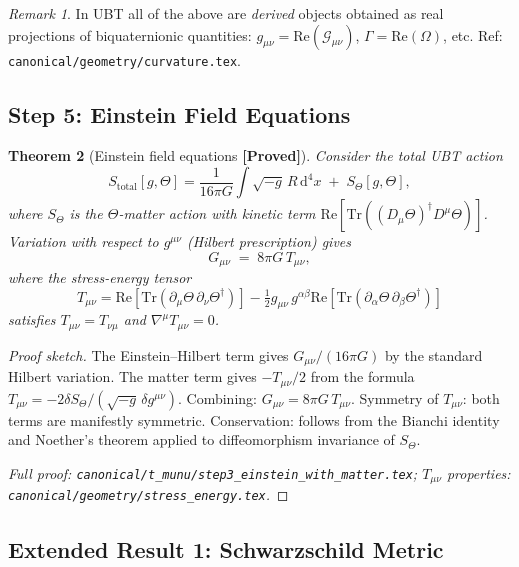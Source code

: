 \documentclass[12pt,a4paper]{article}
\newtheorem{theorem}{Theorem}[section]
\theoremstyle{definition}
\theoremstyle{remark}
\newtheorem{remark}[theorem]{Remark}
\newcommand{\PROVED}{\textbf{[Proved]}}
\begin{document}
\begin{remark}
In UBT all of the above are \emph{derived} objects obtained as real
projections of biquaternionic quantities:
$g_{\mu\nu}=\mathrm{Re}(\mathcal{G}_{\mu\nu})$,
$\Gamma=\mathrm{Re}(\Omega)$, etc.
Ref: \texttt{canonical/geometry/curvature.tex}.
\end{remark}

\subsection{Step 5: Einstein Field Equations}
\label{sec:step5}

\begin{theorem}[Einstein field equations \PROVED]
\label{thm:einstein}
Consider the total UBT action
\[
  S_{\mathrm{total}}[g,\Theta]
  = \frac{1}{16\pi G}\int\!\!\sqrt{-g}\,R\,\mathrm{d}^4x
  \;+\; S_\Theta[g,\Theta],
\]
where $S_\Theta$ is the $\Theta$-matter action with kinetic term
$\mathrm{Re}[\mathrm{Tr}((D_\mu\Theta)^\dagger D^\mu\Theta)]$.
Variation with respect to $g^{\mu\nu}$ (Hilbert prescription) gives
\[
  G_{\mu\nu} \;=\; 8\pi G\,T_{\mu\nu},
\]
where the stress-energy tensor
\[
  T_{\mu\nu}
  = \mathrm{Re}[\mathrm{Tr}(\partial_\mu\Theta\,\partial_\nu\Theta^\dagger)]
  - \tfrac{1}{2}g_{\mu\nu}\,g^{\alpha\beta}
    \mathrm{Re}[\mathrm{Tr}(\partial_\alpha\Theta\,\partial_\beta\Theta^\dagger)]
\]
satisfies $T_{\mu\nu}=T_{\nu\mu}$ and $\nabla^\mu T_{\mu\nu}=0$.
\end{theorem}

\begin{proof}[Proof sketch]
The Einstein--Hilbert term gives $G_{\mu\nu}/(16\pi G)$ by the standard
Hilbert variation.  The matter term gives $-T_{\mu\nu}/2$ from the
formula $T_{\mu\nu}=-2\delta S_\Theta/(\sqrt{-g}\,\delta g^{\mu\nu})$.
Combining: $G_{\mu\nu}=8\pi G\,T_{\mu\nu}$.
Symmetry of $T_{\mu\nu}$: both terms are manifestly symmetric.
Conservation: follows from the Bianchi identity and Noether's theorem
applied to diffeomorphism invariance of $S_\Theta$.

\smallskip
\noindent\textit{Full proof: \texttt{canonical/t\_munu/step3\_einstein\_with\_matter.tex};
$T_{\mu\nu}$ properties: \texttt{canonical/geometry/stress\_energy.tex}.}
\end{proof}

\subsection{Extended Result 1: Schwarzschild Metric}
\label{sec:schwarzschild}
\end{document}
